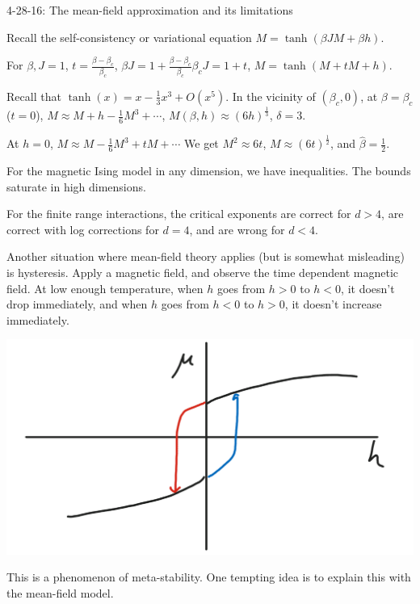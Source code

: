 
{\color{blue}4-28-16: The mean-field approximation and its limitations}

Recall the self-consistency or variational equation $M=\tanh(\beta J M + \beta h)$. 

For $\beta, J=1$, $t=\frac{\beta - \beta_c}{\beta_c}$, $\beta J = 1+\frac{\beta - \beta_c}{\beta_c} \beta_cJ = 1+t$, $M=\tanh(M+tM+h)$.

Recall that $\tanh(x) = x-\frac{1}{3}x^3 + O(x^5)$. In the vicinity of $(\beta_c,0)$, at $\beta = \beta_c$ ($t=0$), $M\approx M+h- \frac{1}{6} M^3 + \cdots$, $M(\beta, h) \approx (6h)^{\frac{1}{3}}$, $\boxed{\delta = 3}$. 

At $h=0$, $M\approx M-\frac{1}{6} M^3 + tM + \cdots$ %
We get $M^2 \approx 6t$, $M\approx (6t)^{\frac{1}{2}}$, and $\boxed{\widehat{\beta} = \frac{1}{2}}$.

For the magnetic Ising model in any dimension, we have inequalities. The bounds saturate in high dimensions.

For the finite range interactions, the critical exponents are correct for $d>4$, are correct with log corrections for $d=4$, and are wrong for $d<4$.

Another situation where mean-field theory applies (but is somewhat misleading) is hysteresis. Apply a magnetic field, and observe the time dependent magnetic field. At low enough temperature, when $h$ goes from $h>0$ to $h<0$, it doesn't drop immediately, and when $h$ goes from $h<0$ to $h>0$, it doesn't increase immediately.

\begin{center}\includegraphics[scale=.25]{images/hys}\end{center}

This is a phenomenon of meta-stability.
One tempting idea is to explain this with the mean-field model.

